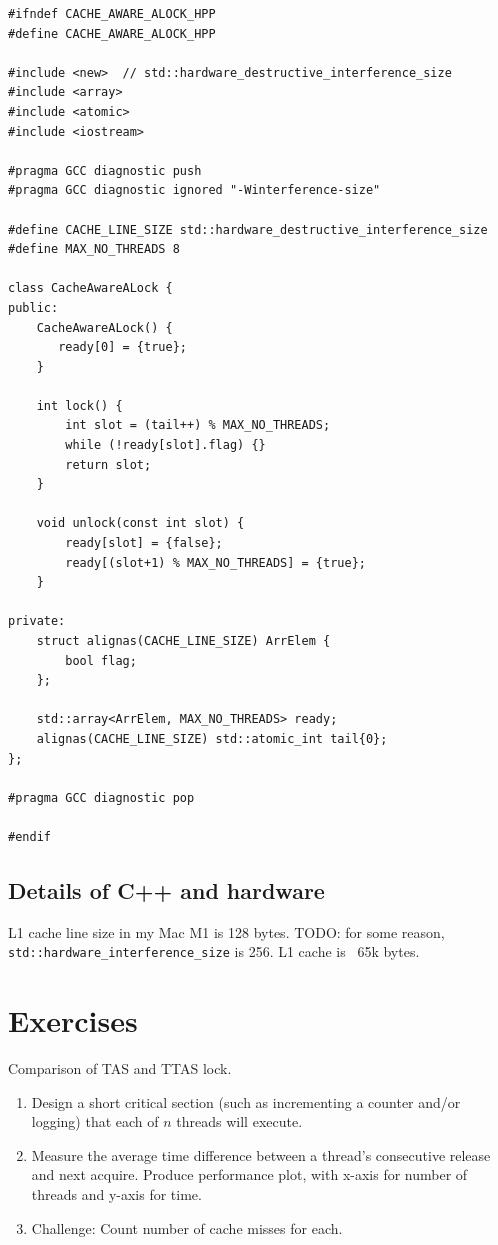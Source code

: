 \makebox[\linewidth]{\rule{17cm}{0.4pt}}
{\centering \label{code:Alock}
\begin{verbatim}
#ifndef CACHE_AWARE_ALOCK_HPP
#define CACHE_AWARE_ALOCK_HPP

#include <new>  // std::hardware_destructive_interference_size
#include <array>
#include <atomic>
#include <iostream>

#pragma GCC diagnostic push
#pragma GCC diagnostic ignored "-Winterference-size"

#define CACHE_LINE_SIZE std::hardware_destructive_interference_size
#define MAX_NO_THREADS 8

class CacheAwareALock {
public:
    CacheAwareALock() {
       ready[0] = {true};
    }

    int lock() {
        int slot = (tail++) % MAX_NO_THREADS;
        while (!ready[slot].flag) {}
        return slot;
    }

    void unlock(const int slot) {
        ready[slot] = {false};
        ready[(slot+1) % MAX_NO_THREADS] = {true};
    }

private:
    struct alignas(CACHE_LINE_SIZE) ArrElem {
        bool flag;
    };

    std::array<ArrElem, MAX_NO_THREADS> ready;
    alignas(CACHE_LINE_SIZE) std::atomic_int tail{0}; 
};

#pragma GCC diagnostic pop

#endif
\end{verbatim}
\makebox[\linewidth]{\rule{17cm}{0.4pt}}
}

\subsection{Details of C++ and hardware}
L1 cache line size in my Mac M1 is 128 bytes. TODO: for some reason, \verb|std::hardware_interference_size| is 256. L1 cache is ~65k bytes.

\section{Exercises}
\begin{exercise}
    Comparison of TAS and TTAS lock.
    \begin{enumerate}
        \item Design a short critical section (such as incrementing a counter and/or logging) that each of $n$ threads will execute.
        \item Measure the average time difference between a thread's consecutive release and next acquire. Produce performance plot, with x-axis for number of threads and y-axis for time.
        \item Challenge: Count number of cache misses for each.
    \end{enumerate}
\end{exercise}

